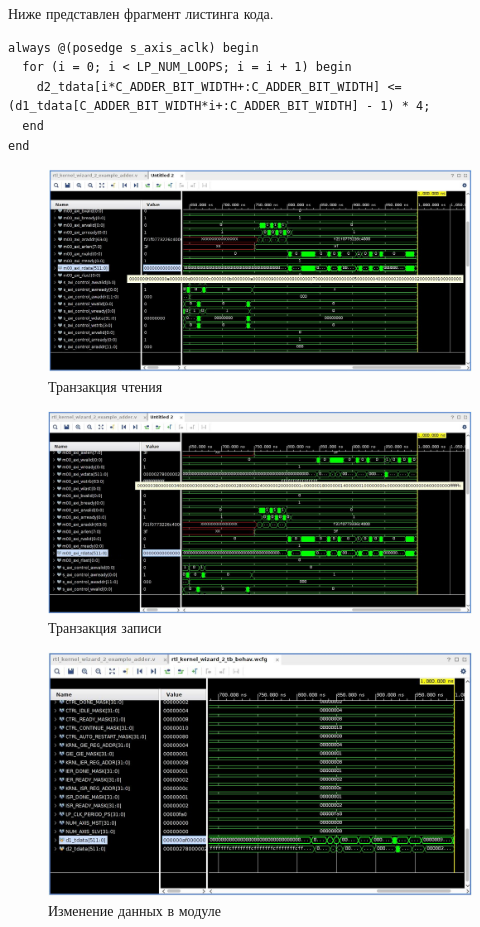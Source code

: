 Ниже представлен фрагмент листинга кода.

\begin{lstlisting}[language=Pseudocode,caption=Листинг изменённой функции]
always @(posedge s_axis_aclk) begin
  for (i = 0; i < LP_NUM_LOOPS; i = i + 1) begin
    d2_tdata[i*C_ADDER_BIT_WIDTH+:C_ADDER_BIT_WIDTH] <= (d1_tdata[C_ADDER_BIT_WIDTH*i+:C_ADDER_BIT_WIDTH] - 1) * 4;
  end
end
\end{lstlisting}

\begin{figure}[ht]
	\centering
	\includegraphics[width=\linewidth]{img/mod-1.png}
	\caption{Транзакция чтения}
\end{figure}

\begin{figure}[ht]
	\centering
	\includegraphics[width=\linewidth]{img/mod-2.png}
	\caption{Транзакция записи}
\end{figure}

\begin{figure}[ht]
	\centering
	\includegraphics[width=\linewidth]{img/mod-3.png}
	\caption{Изменение данных в модуле}
\end{figure}

